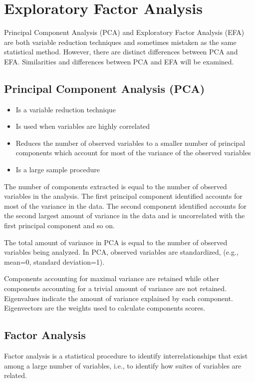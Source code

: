 \documentclass[a4paper,12pt]{article}
\begin{document}
	
	\tableofcontents

\section{Exploratory Factor Analysis}
Principal Component Analysis (PCA) and Exploratory Factor Analysis (EFA) are both variable reduction techniques
and sometimes mistaken as the same statistical method. However, there are distinct differences between PCA and
EFA. Similarities and differences between PCA and EFA will be examined.


\subsection{Principal Component Analysis (PCA)}
\begin{itemize}
\item Is a variable reduction technique
\item Is used when variables are highly correlated
\item Reduces the number of observed variables to a smaller number of principal components which account for most
of the variance of the observed variables
\item Is a large sample procedure
\end{itemize}

The number of components extracted is equal to the number of observed variables in the analysis. The first principal
component identified accounts for most of the variance in the data. The second component identified accounts for the
second largest amount of variance in the data and is uncorrelated with the first principal component and so on.


The total amount of variance in PCA is equal to the number of observed variables being analyzed. In PCA, observed
variables are standardized, (e.g., mean=0, standard deviation=1).

Components accounting for maximal variance are retained while other components accounting for a trivial amount of
variance are not retained. Eigenvalues indicate the amount of variance explained by each component. Eigenvectors
are the weights used to calculate components scores.


\subsection{Factor Analysis}
Factor analysis is a statistical procedure to identify interrelationships that
exist among a large number of variables, i.e.,  to identify how suites of
variables are related.
\end{document}

